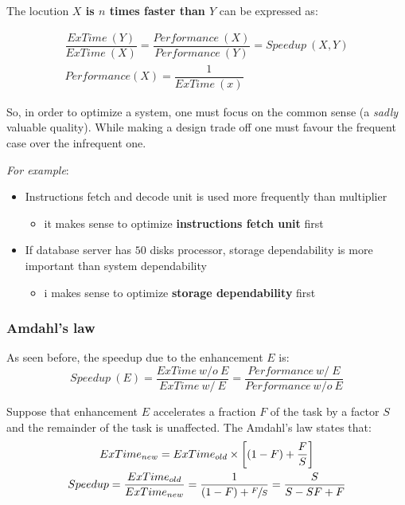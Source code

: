 \documentclass[english]{article}
\begin{document}
\bigskip
The locution \textbf{\(X\) is \(n\) times faster than \(Y\)} can be expressed as:

\begin{gather*}
  \dfrac{ExTime\ (Y)}{ExTime\ (X)}  = \dfrac{Performance\ (X)}{Performance\ (Y)} = Speedup\ (X, Y) \\
  Performance(X) = \dfrac{1}{ExTime\ (x)}
\end{gather*}

So, in order to optimize a system, one must focus on the common sense (a \textit{sadly} valuable quality).
While making a design trade off one must favour the frequent case over the infrequent one.

\textit{For example}:
\begin{itemize}
  \item Instructions fetch and decode unit is used more frequently than multiplier
        \begin{itemize}
          \item it makes sense to optimize \textbf{instructions fetch unit} first
        \end{itemize}
  \item If database server has \(50\) disks processor, storage dependability is more important than system dependability
        \begin{itemize}
          \item i makes sense to optimize \textbf{storage dependability} first
        \end{itemize}
\end{itemize}

\subsubsection{Amdahl's law}

As seen before, the speedup due to the enhancement \(E\) is:
\[ Speedup\ (E)  = \dfrac{ExTime\ w/o\ E}{ExTime\ w/\ E} = \dfrac{Performance\ w/\ E}{Performance\ w/o\ E} \]

Suppose that enhancement \(E\) accelerates a fraction \(F\) of the task by a factor \(S\) and the remainder of the task is unaffected.
The Amdahl's law states that:
\begin{gather*}
  ExTime_{new} = ExTime_{old} \times \left[\left(1 - F\right) + \dfrac{F}{S}\right] \\
  Speedup = \dfrac{ExTime_{old}}{ExTime_{new}} = \dfrac{1}{(1 - F) + \sfrac{F}{S}} = \dfrac{S}{S - SF + F}
\end{gather*}
\end{document}
